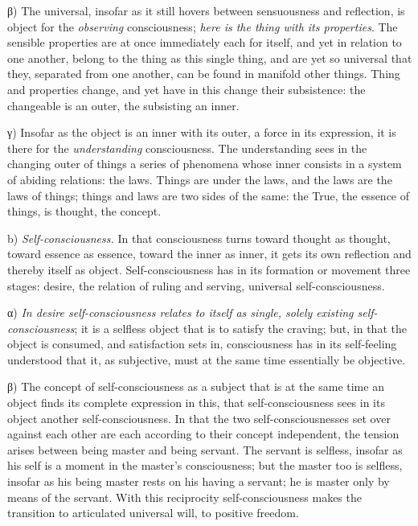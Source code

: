\documentclass[12pt]{book}
\begin{document}
β) The universal, insofar as it still hovers between sensuousness and reflection,
is object for the \emph{observing} consciousness; \emph{here is the thing with its
properties}. The sensible properties are at once immediately each for itself, and
yet in relation to one another, belong to the thing as this single thing, and are
yet so universal that they, separated from one another, can be found in manifold
other things. Thing and properties change, and yet have in this change their
subsistence: the changeable is an outer, the subsisting an inner.

γ) Insofar as the object is an inner with its outer, a force in its expression, it
is there for the \emph{understanding} consciousness. The understanding sees in the
changing outer of things a series of phenomena whose inner consists in a system of
abiding relations: the laws. Things are under the laws, and the laws are the laws
of things; things and laws are two sides of the same: the True, the essence of
things, is thought, the concept.

b) \emph{Self-consciousness.} In that consciousness turns toward thought as
thought, toward essence as essence, toward the inner as inner, it gets its own
reflection and thereby itself as object. Self-consciousness has in its formation or
movement three stages: desire, the relation of ruling and serving, universal
self-consciousness.

α) \emph{In desire self-consciousness relates to itself as single, solely existing
self-consciousness}; it is a selfless object that is to satisfy the craving; but,
in that the object is consumed, and satisfaction sets in,
consciousness has in its self-feeling understood that it, as subjective, must at
the same time essentially be objective.

β) The concept of self-consciousness as a subject that is at the same time an
object finds its complete expression in this, that self-consciousness sees in its
object another self-consciousness. In that the two self-consciousnesses set over
against each other are each according to their concept independent, the tension
arises between being master and being servant. The servant is selfless, insofar as
his self is a moment in the master's consciousness; but the master too is selfless,
insofar as his being master rests on his having a servant; he is master only by
means of the servant. With this reciprocity self-consciousness makes the transition
to articulated universal will, to positive freedom.
\end{document}
